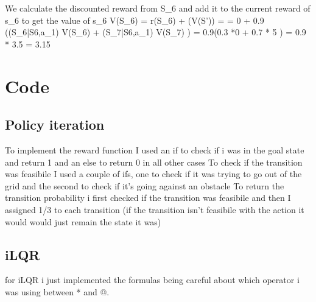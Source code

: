\documentclass[10pt,a4paper]{article}
\begin{document}
We calculate the discounted reward from S_{6} and add it to the current reward of s_{6} to get the value of s_{6}
V(S_{6}) = r(S_{6}) + \gamma \EX(V(S')) = \newline
= 0 + 0.9 ((S_{6}|S{6,a_{1}}) V(S_{6}) + (S_{7}|S{6,a_{1}}) V(S_{7}) ) = 0.9(0.3 *0 + 0.7 * 5 ) = 0.9 * 3.5 = 3.15 
\newpage
\section*{Code}

\subsection*{Policy iteration}
To implement the reward function I used an if to check if i was in the goal state and return 1 and an else to return 0 in all other cases
\newline
To check if the transition was feasibile I used a couple of ifs, one to check if it was trying to go out of the grid and the second to check if it's going against an obstacle 
\newline
To return the transition probability i first checked if the transition was feasibile and then I assigned 1/3 to each transition (if the transition isn't feasibile with the action it would would just remain the state it was)
\newpage
\subsection*{iLQR}
for iLQR i just implemented the formulas being careful about which operator i was using between * and @.
\end{document}
